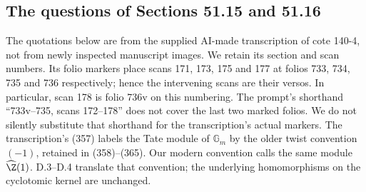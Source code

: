 \subsection{The questions of Sections 51.15 and 51.16}

The quotations below are from the supplied AI-made transcription of
cote 140-4, not from newly inspected manuscript images. We retain its
section and scan numbers. Its folio markers place scans 171, 173, 175
and 177 at folios 733, 734, 735 and 736 respectively; hence the intervening
scans are their versos. In particular, scan 178 is folio 736v on this
numbering. The prompt's shorthand ``733v--735, scans 172--178'' does not
cover the last two marked folios. We do not silently substitute that
shorthand for the transcription's actual markers.
The transcription's (357) labels the Tate module of $\mathbb G_m$
by the older twist convention $(-1)$, retained in (358)--(365).
Our modern convention calls the same module $\widehat\Z(1)$.
D.3--D.4 translate that convention; the underlying homomorphisms on
the cyclotomic kernel are unchanged.

